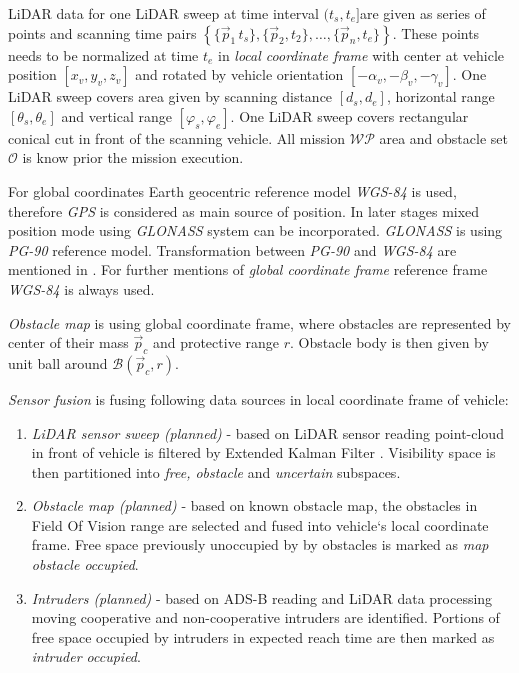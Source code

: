 LiDAR data for one LiDAR sweep at time interval $(t_s, t_e] $are given as series of points and scanning time pairs $\left\{\{\vec{p}_1\,t_s\},\{\vec{p}_2,t_2\},\dots,\{\vec{p}_n,t_e\}\right\}$. These points needs to be normalized at time $t_e$ in \textit{local coordinate frame} with center at vehicle position $[x_v,y_v,z_v]$ and rotated by vehicle orientation $[-\alpha_v,-\beta_v,-\gamma_v]$. One LiDAR sweep covers area given by scanning distance $[d_s,d_e]$, horizontal range $[\theta_s,\theta_e]$ and vertical range $[\varphi_s,\varphi_e]$. One LiDAR sweep covers rectangular conical cut in front of the scanning vehicle. All mission $\mathscr{WP}$ area and obstacle set $\mathscr{O}$ is know prior the mission execution.

For global coordinates Earth geocentric reference model \textit{WGS-84} is used, therefore \textit{GPS} is considered as main source of position. In later stages mixed position mode using \textit{GLONASS} system can be incorporated. \textit{GLONASS} is using \textit{PG-90} reference model. Transformation between \textit{PG-90} and \textit{WGS-84} are mentioned in \cite{misra1996integrated}. For further mentions of \textit{global coordinate frame} reference frame \textit{WGS-84} is always used.

\textit{Obstacle map} is using global coordinate frame, where obstacles are represented by center of their mass $\vec{p}_c$ and protective range $r$. Obstacle body is then given by unit ball around $\mathscr{B}(\vec{p}_c,r)$.

\noindent\textit{Sensor fusion} is fusing following data sources in local coordinate frame of vehicle:
\begin{enumerate}
    \item \textit{LiDAR sensor sweep (planned)} - based on LiDAR sensor reading point-cloud in front of vehicle is filtered by Extended Kalman Filter \cite{blanc2005ekf}. Visibility space is then partitioned into \textit{free, obstacle} and \textit{uncertain} subspaces.
    \item \textit{Obstacle map (planned)} - based on known obstacle map, the obstacles in Field Of Vision range are selected and fused into vehicle`s local coordinate frame. Free space previously unoccupied by by obstacles is marked as \textit{map obstacle occupied}.
    \item \textit{Intruders (planned)} - based on ADS-B reading and LiDAR data processing moving cooperative and non-cooperative intruders are identified. Portions of free space occupied by intruders in expected reach time are then marked as \textit{intruder occupied}.
\end{enumerate}

